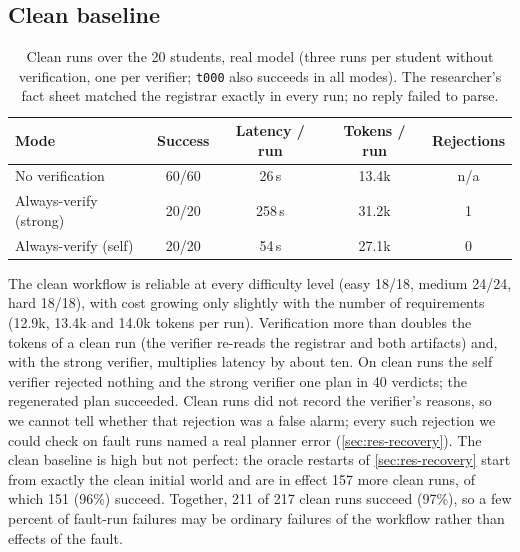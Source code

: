 \documentclass[11pt]{article}
\newcommand{\code}[1]{\texttt{\small #1}}
\begin{document}
\subsection{Clean baseline}
\label{sec:res-clean}
\begin{table}[h]
\centering\small
\begin{tabular}{lcccc}
\toprule
Mode & Success & Latency / run & Tokens / run & Rejections \\
\midrule
No verification            & 60/60 & 26\,s  & 13.4k & n/a \\
Always-verify (strong)     & 20/20 & 258\,s & 31.2k & 1 \\
Always-verify (self)       & 20/20 & 54\,s  & 27.1k & 0 \\
\bottomrule
\end{tabular}
\caption{Clean runs over the 20 students, real model (three runs per student
without verification, one per verifier; \code{t000} also succeeds in all
modes). The researcher's fact sheet matched the
registrar exactly in every run; no reply failed to parse.}
\label{tab:clean}
\end{table}
The clean workflow is reliable at every difficulty level (easy 18/18, medium
24/24, hard 18/18), with cost growing only slightly with the number of
requirements (12.9k, 13.4k and 14.0k tokens per run). Verification more than
doubles the tokens of a clean run (the verifier re-reads the registrar and
both artifacts) and, with the strong verifier, multiplies latency by about
ten. On clean runs the self verifier rejected nothing and the strong
verifier one plan in 40 verdicts; the regenerated plan succeeded. Clean runs
did not record the verifier's reasons, so we cannot tell whether that
rejection was a false alarm; every such rejection we could check on fault
runs named a real planner error (\cref{sec:res-recovery}). The clean
baseline is high but not perfect: the oracle restarts of \cref{sec:res-recovery}
start from exactly the clean initial world and are in effect 157 more clean
runs, of which 151 (96\%) succeed. Together, 211 of 217 clean runs succeed
(97\%), so a few percent of fault-run failures may be ordinary failures of the
workflow rather than effects of the fault.
\end{document}
